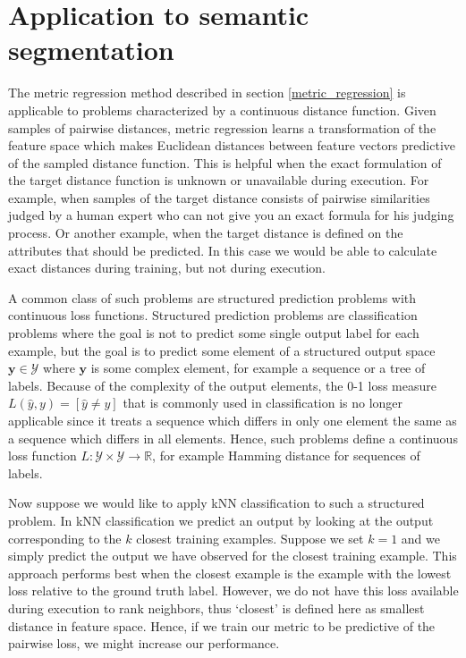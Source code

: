 \documentclass[a4paper,titlepage]{article}
\renewcommand{\vec}[1]{\mathbf{#1}}
\begin{document}
\pagebreak
\section{Application to semantic segmentation}

The metric regression method described in section \ref{metric_regression} is applicable to problems characterized by a continuous distance function. Given samples of pairwise distances, metric regression learns a transformation of the feature space which makes Euclidean distances between feature vectors predictive of the sampled distance function. This is helpful when the exact formulation of the target distance function is unknown or unavailable during execution. For example, when samples of the target distance consists of pairwise similarities judged by a human expert who can not give you an exact formula for his judging process. Or another example, when the target distance is defined on the attributes that should be predicted. In this case we would be able to calculate exact distances during training, but not during execution.

A common class of such problems are structured prediction problems with continuous loss functions. Structured prediction problems are classification problems where the goal is not to predict some single output label for each example, but the goal is to predict some element of a structured output space $\vec{y} \in \mathcal{Y}$ where $\vec{y}$ is some complex element, for example a sequence or a tree of labels. Because of the complexity of the output elements, the 0-1 loss measure $L(\hat{y}, y) = \left[\hat{y} \ne y\right]$ that is commonly used in classification is no longer applicable since it treats a sequence which differs in only one element the same as a sequence which differs in all elements. Hence, such problems define a continuous loss function $L: \mathcal{Y} \times \mathcal{Y} \rightarrow \mathbb{R}$, for example Hamming distance for sequences of labels.

Now suppose we would like to apply \acf{kNN} classification to such a structured problem. In \ac{kNN} classification we predict an output by looking at the output corresponding to the $k$ closest training examples. Suppose we set $k = 1$ and we simply predict the output we have observed for the closest training example. This approach performs best when the closest example is the example with the lowest loss relative to the ground truth label. However, we do not have this loss available during execution to rank neighbors, thus `closest' is defined here as smallest distance in feature space. Hence, if we train our metric to be predictive of the pairwise loss, we might increase our performance.
\end{document}
